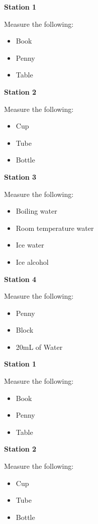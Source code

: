 \documentclass[14pt, fleqn, paper=letter, oneside, twocolumn]{scrartcl}
\begin{document}
\thispagestyle{empty}
\textbf{\LARGE Station 1}

Measure the following:
\begin{itemize}
\item Book
\item Penny
\item Table
\end{itemize}

\vfill

\textbf{\LARGE Station 2}

Measure the following:
\begin{itemize}
\item Cup
\item Tube
\item Bottle
\end{itemize}

\vfill

\textbf{\LARGE Station 3}

Measure the following:
\begin{itemize}
\item Boiling water
\item Room temperature water
\item Ice water
\item Ice alcohol
\end{itemize}

\vfill

\textbf{\LARGE Station 4}

Measure the following:
\begin{itemize}
\item Penny
\item Block
\item 20mL of Water
\end{itemize}


\newpage
\textbf{\LARGE Station 1}

Measure the following:
\begin{itemize}
\item Book
\item Penny
\item Table
\end{itemize}

\vfill

\textbf{\LARGE Station 2}

Measure the following:
\begin{itemize}
\item Cup
\item Tube
\item Bottle
\end{itemize}
\end{document}
